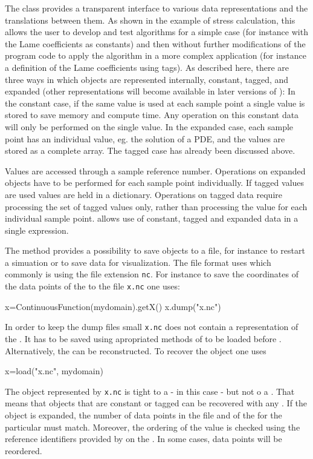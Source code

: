 The \Data class provides a transparent interface to various data representations and the 
translations between them. As shown in the example of stress calculation, this allows the user to
develop and test algorithms for a simple case (for instance with the Lame coefficients as constants)
and then without further modifications of the program code to apply the algorithm in a
more complex application (for instance a definition of the Lame coefficients using tags). 
As described here, there are three ways in which \Data objects are represented internally, constant, 
tagged, and expanded (other representations will become available in later versions of \escript):
In the constant case, if the same value is used at each sample point a single value is stored to save memory and compute time. 
Any operation on this constant data will only be performed on the single value. 
In the expanded case, each sample point has an individual value, eg. the solution of a PDE,
and the values are stored as a complete array. The tagged case has already been discussed above.
 
Values are accessed through a sample reference number. Operations on expanded \Data
objects have to be performed for each sample point individually. If tagged values are used values are
held in a dictionary. Operations on tagged data require processing the set of tagged values only, rather than 
processing the value for each individual sample point. 
\escript allows use of constant, tagged and expanded data in a single expression.

The  method provides a possibility to save \Data objects to a file, for instance to restart a simuation
or to save data for visualization. The file format uses \netCDF which commonly is using the file extension
{\tt nc}. For instance to save the coordinates of the data points of the \FunctionSpace
\ContinuousFunction to the file {\tt x.nc} one uses:
\begin{python}
x=ContinuousFunction(mydomain).getX()
x.dump("x.nc")
\end{python}
In order to keep the dump files small {\tt x.nc} does not contain a representation of the \Domain. It has to be saved using 
apropriated methods of  to be loaded before . Alternatively, the \Domain can be reconstructed. 
To recover the object  one uses
\begin{python}
x=load("x.nc", mydomain)
\end{python}
The \Data object represented by {\tt x.nc} is tight to a \FunctionSpace - in this case \ContinuousFunction - but not 
o a \Domain. That means that \Data objects that are constant or tagged can be recovered with any \Domain. If the \Data object
is expanded, the number of data points in the file and of the \Domain for the particular \FunctionSpace must match. 
Moreover, the ordering of the value is checked using the reference identifiers provided by 
\FunctionSpace on the \Domain. In some cases, data points will be reordered.


